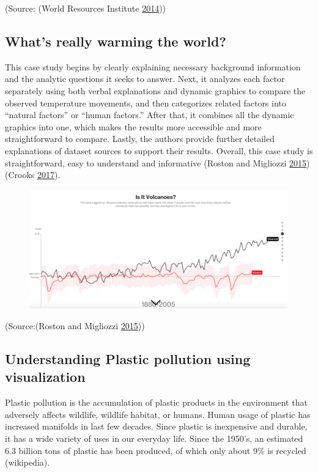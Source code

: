 \documentclass[]{book}
\theoremstyle{definition}
\theoremstyle{definition}
\theoremstyle{definition}
\theoremstyle{remark}
\begin{document}
(Source: (World Resources Institute
\protect\hyperlink{ref-CO2_emission}{2014}))

\subsection{What's really warming the
world?}\label{whats-really-warming-the-world}

This case study begins by clearly explaining necessary background
information and the analytic questions it seeks to answer. Next, it
analyzes each factor separately using both verbal explanations and
dynamic graphics to compare the observed temperature movements, and then
categorizes related factors into ``natural factors'' or ``human
factors.'' After that, it combines all the dynamic graphics into one,
which makes the results more accessible and more straightforward to
compare. Lastly, the authors provide further detailed explanations of
dataset sources to support their results. Overall, this case study is
straightforward, easy to understand and informative (Roston and
Migliozzi \protect\hyperlink{ref-world_warming}{2015}) (Crooks
\protect\hyperlink{ref-int_viz_capt}{2017}).

\begin{figure}
\centering
\includegraphics{images/volcano_global_warming.png}
\caption{}
\end{figure}

(Source:(Roston and Migliozzi
\protect\hyperlink{ref-world_warming}{2015}))

\subsection{Understanding Plastic pollution using
visualization}\label{understanding-plastic-pollution-using-visualization}

Plastic pollution is the accumulation of plastic products in the
environment that adversely affects wildlife, wildlife habitat, or
humans. Human usage of plastic has increased manifolds in last few
decades. Since plastic is inexpensive and durable, it has a wide variety
of uses in our everyday life. Since the 1950's, an estimated 6.3 billion
tons of plastic has been produced, of which only about 9\% is recycled
(wikipedia).
\end{document}
